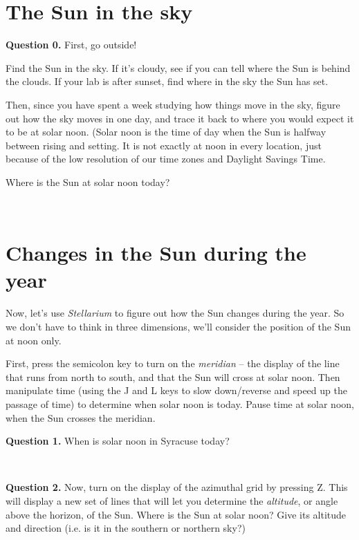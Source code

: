 \documentclass[11pt]{article}
\begin{document}
\newpage
\section{The Sun in the sky}



\noindent \textbf{Question 0.} 
First, go outside!

Find the Sun in the sky. If it's cloudy, see if you can tell where the Sun is behind the clouds. If your lab is after sunset, find where in the sky the Sun has set.

Then, since you have spent a week studying how things move in the sky, figure out how the sky moves in one day, and trace it back to where you would expect it to be at solar noon. (Solar noon is the time of day when the Sun is halfway between rising and setting. It is not exactly at noon in every location, just because of the low resolution of our time zones and Daylight Savings Time.


Where is the Sun at solar noon today?
\vspace*{1.5cm}

\hrulefill\\
\noindent

\section{Changes in the Sun during the year}

Now, let's use {\it Stellarium} to figure out how the Sun changes during the year. So we don't have to think in three dimensions, we'll consider the position of the Sun at noon only.

First, press the semicolon key to turn on the {\it meridian} -- the display of the line that runs from north to south, and that the Sun will cross at solar noon. Then manipulate time (using the J and L keys to slow down/reverse and speed up the passage
of time) to determine when solar noon is today. Pause time at solar noon, when the Sun crosses the meridian.



\textbf{Question 1.} When is solar noon in Syracuse today? 
\vspace*{1.9cm}

\hrulefill\\
\noindent

\noindent \textbf{Question 2.} 
Now, turn on the display of the azimuthal grid by pressing Z. This will display a new set of lines that will let you determine the {\it altitude}, or angle above the horizon, of the Sun. Where is the Sun at solar noon? Give its altitude and 
direction (i.e. is it in the southern or northern sky?)
\end{document}
